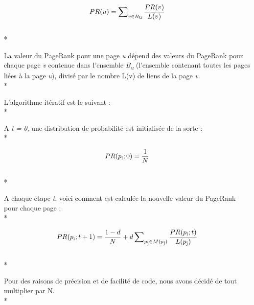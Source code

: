 \documentclass{article}
\begin{document}
\begin{enumerate}
\begin{item}

\begin{equation*}
PR(u) = \sum\nolimits_{v \in B \textsubscript{u}} \frac{PR(v)}{L(v)}
\end{equation*}
~\\*

La valeur du PageRank pour une page \textit{u} d\'{e}pend des valeurs du PageRank pour chaque page \textit{v} contenue dans l'ensemble \textit{B\textsubscript{u}} (l'ensemble contenant toutes les pages li\'{e}es \`{a} la page \textit{u}), divis\'{e} par le nombre L(v) de liens de la page \textit{v}. \\*

\end{item}
\begin{item}

L'algorithme it\'{e}ratif est le suivant : \\*

A \textit{t = 0}, une distribution de probabilit\'{e} est initialis\'{e}e de la sorte : \\*

\begin{equation*}
PR(p\textsubscript{i};0) = \frac{1}{N}
\end{equation*}
~\\*

\end{item}
\begin{item}

A chaque \'{e}tape \textit{t}, voici comment est calcul\'{e}e la nouvelle valeur du PageRank pour chaque page : \\*

\begin{equation*}
PR(p\textsubscript{i};t + 1) = \frac{1-d}{N} + d \sum\nolimits_{p\textsubscript{j} \in M(p\textsubscript{j})} \frac{PR(p\textsubscript{i};t)}{L(p\textsubscript{j})}
\end{equation*}
~\\*
\end{item}
\end{enumerate}

Pour des raisons de pr\'{e}cision et de facilit\'{e} de code, nous avons d\'{e}cid\'{e} de tout multiplier par N. \\*
 
\end{document}
